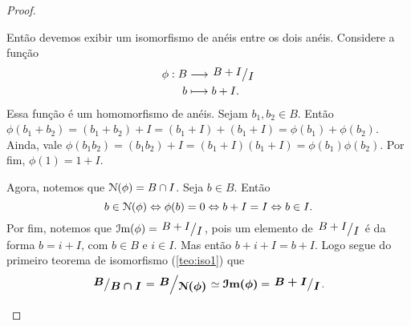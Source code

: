 \begin{proof}
\begin{enumerate}
	Então devemos exibir um isomorfismo de anéis entre os dois anéis. Considere a função
	\begin{align*}
	\phi: B &\to \quo{B+I}{I} \\
		b &\mapsto b+I.
	\end{align*}
Essa função é um homomorfismo de anéis. Sejam $b_1,b_2 \in B$. Então $\phi(b_1+b_2)=(b_1+b_2)+I=(b_1+I)+(b_1+I)=\phi(b_1)+\phi(b_2)$. Ainda, vale $\phi(b_1b_2)=(b_1b_2)+I=(b_1+I)(b_1+I)=\phi(b_1)\phi(b_2)$. Por fim, $\phi(1)=1+I$.

	Agora, notemos que $\mathcal{N}(\phi)=B \cap I$. Seja $b \in B$. Então
	\begin{equation*}
	b \in \mathcal{N}(\phi) \Leftrightarrow \phi(b)=0 \Leftrightarrow b+I = I \Leftrightarrow b \in I.
	\end{equation*}
	Por fim, notemos que $\im(\phi)=\quo{B+I}{I}$, pois um elemento de $\quo{B+I}{I}$ é da forma $b=i+I$, com $b \in B$ e $i \in I$. Mas então $b+i+I=b+I$. Logo segue do primeiro teorema de isomorfismo (\ref{teo:iso1}) que
	\begin{equation*}
	\bm{\quo{B}{B \cap I}} = \bm{\quo{B}{\nuc(\phi)}} \simeq \bm{\im(\phi)} =\bm{\quo{B+I}{I}}.
	\end{equation*}
	\end{enumerate}
\end{proof}

